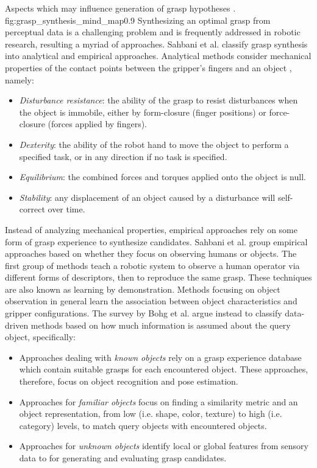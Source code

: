              {Aspects which may influence generation of grasp hypotheses \cite{Bohg2014}.}
             {fig:grasp_synthesis_mind_map}{0.9\textwidth}
Synthesizing an optimal grasp from perceptual data is a challenging problem and is frequently addressed in
robotic research, resulting a myriad of approaches. Sahbani et al. \cite{Sahbani2012} classify grasp synthesis
into analytical and empirical approaches. Analytical methods consider mechanical properties of the contact
points between the gripper's fingers and an object \cite{Roa2015,Sahbani2012,Shimoga1996}, namely:
\begin{itemize}
\item \emph{Disturbance resistance}: the ability of the grasp to resist disturbances when the object is immobile, either
    by form-closure (finger positions) or force-closure (forces applied by fingers).
\item \emph{Dexterity}: the ability of the robot hand to move the object to perform a specified task, or in any direction
    if no task is specified.
\item \emph{Equilibrium}: the combined forces and torques applied onto the object is null.
\item \emph{Stability}: any displacement of an object caused by a disturbance will self-correct over time.
\end{itemize}
Instead of analyzing mechanical properties, empirical approaches rely on some form of grasp experience to synthesize
candidates. Sahbani et al. \cite{Sahbani2012} group empirical approaches based on whether they focus on observing humans
or objects. The first group of methods teach a robotic system to observe a human operator via different forms of
descriptors, then to reproduce the same grasp. These techniques are also known as learning by demonstration.
Methods focusing on object observation in general learn the association between object characteristics and gripper
configurations. The survey by Bohg et al. \cite{Bohg2014} argue instead to classify data-driven methods based on how
much information is assumed about the query object, specifically:
\begin{itemize}
    \item Approaches dealing with \emph{known objects} rely on a grasp experience database which contain suitable grasps
    for each encountered object. These approaches, therefore, focus on object recognition and pose estimation.
    \item Approaches for \emph{familiar objects} focus on finding a similarity metric and an object representation,
    from low (i.e. shape, color, texture) to high (i.e. category) levels, to match query objects with encountered
    objects.
    \item Approaches for \emph{unknown objects} identify local or global features from sensory data to for generating
    and evaluating grasp candidates.
\end{itemize}
